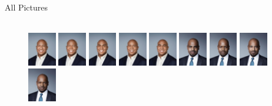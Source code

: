 \documentclass[10pt]{beamer}
\begin{document}
{\begin{frame}{All Pictures}
\begin{adjustwidth}
\begin{figure}[h!]
\\ 
\centering
\includegraphics[width=0.11\textwidth]{img/pic/ward-BM-227.jpg}\hfill
\includegraphics[width=0.11\textwidth]{img/pic/ward-BM-033.jpg}\hfill
\includegraphics[width=0.11\textwidth]{img/pic/ward-BM-011.jpg}\hfill
\includegraphics[width=0.11\textwidth]{img/pic/ward-BM-245.jpg}\hfill
\includegraphics[width=0.11\textwidth]{img/pic/ward-BM-208.jpg}\hfill
\includegraphics[width=0.11\textwidth]{img/pic/blackwell-BM-208.jpg}\hfill
\includegraphics[width=0.11\textwidth]{img/pic/blackwell-BM-251.jpg}\hfill
\includegraphics[width=0.11\textwidth]{img/pic/blackwell-BM-212.jpg}\hfill
\includegraphics[width=0.11\textwidth]{img/pic/blackwell-BM-017.jpg}

\end{figure}
\end{adjustwidth}
\vspace{-2cm}
\end{frame}
}
\end{document}
